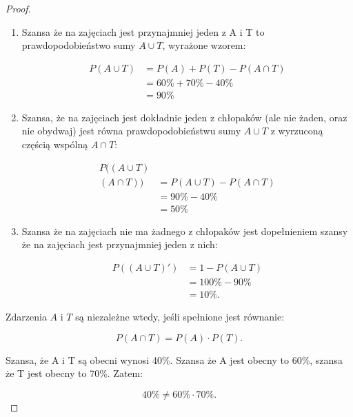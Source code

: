 \documentclass[11pt]{article}
\theoremstyle{definition}
\numberwithin{zadanie}{section}
\begin{document}
\begin{proof}

    \begin{enumerate}
        \item Szansa że na zajęciach jest przynajmniej jeden z A i T to prawdopodobieństwo sumy $A\cup T$, wyrażone wzorem:

              \begin{align*}
                  P(A\cup T) & = P(A) + P(T) - P(A\cap T) \\
                             & = 60\% + 70\% - 40\%       \\
                             & = 90\%
              \end{align*}

        \item Szansa, że na zajęciach jest dokładnie jeden z chłopaków (ale nie żaden, oraz nie obydwaj) jest równa prawdopodobieństwu sumy $A\cup T$ z wyrzuconą częścią wspólną $A\cap T$:

              \begin{align*}
                  P((A\cup T)      \\(A\cap T)) &= P(A\cup T) - P(A\cap T)\\
                   & = 90\% - 40\% \\
                   & = 50\%
              \end{align*}

        \item Szansa że na zajęciach nie ma żadnego z chłopaków jest dopełnieniem szansy że na zajęciach jest przynajmniej jeden z nich:

              \begin{align*}
                  P((A\cup T)') & = 1 - P(A\cup T) \\
                                & = 100\% - 90\%   \\
                                & = 10\%.
              \end{align*}

    \end{enumerate}


    Zdarzenia $A$ i $T$ są niezależne wtedy, jeśli spełnione jest równanie:

    $$P(A\cap T) = P(A)\cdot P(T).$$

    Szansa, że A i T są obecni wynosi 40\%. Szansa że A jest obecny to 60\%, szansa że T jest obecny to 70\%. Zatem:

    $$40\% \neq 60\%\cdot 70\%.$$



\end{proof}
\end{document}
